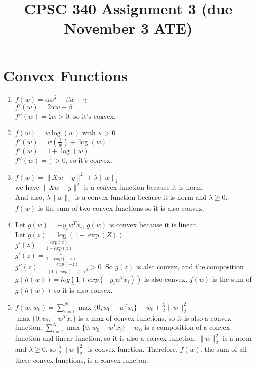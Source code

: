\documentclass{article}
\def\norm#1{\|#1\|}
\def\enum#1{\begin{enumerate}#1\end{enumerate}}
\begin{document}
\title{CPSC 340 Assignment 3 (due November 3 ATE)}
\author{}
\date{}
\maketitle
\vspace{-4em}



\section{Convex Functions}

\enum{
\item $f(w) = \alpha w^2 - \beta w + \gamma$\\
         $f'(w) = 2\alpha w  - \beta $\\
          $f''(w) = 2\alpha   >0  $, so it's convex.
\item $f(w) = w\log(w) $ with $w > 0$\\ 
       $f'(w) = w(\frac{1}{w})+ \log(w) $\\
       $f'(w) = 1+ \log(w) $ \\
       $f''(w) = \frac{1}{w}  >0 $, so it's convex.
\item $f(w) = \norm{Xw-y}^2 + \lambda\norm{w}_1$ \\
        we have $ \norm{Xw-y}^2$ is a convex function because it is norm.\\
       And also, $\lambda\norm{w}_1$  is a convex function because it is norm and $\lambda \geq 0$.\\ $f(w)$ is the sum of two convex functions so it is also convex. 
\item Let $g(w) = -y_iw^Tx_i$, $g(w)$ is convex because it is linear.\\
      Let  $g(z) = \log(1+\exp(Z))$\\
        $g'(z) = \frac{exp(z)}{1+exp(z)}$\\
         $g'(z) = \frac{1}{1+exp(-z)}$\\
        $g''(z) =  \frac{exp(-z)}{(1+exp(-z))^2}   > 0 $. So $g(z)$ is also convex, and the composition $g(h(w)) = log(1+exp(-y_iw^Tx_i))$ is also convex. $f(w)$ is the sum of $g(h(w))$ so it is also convex.
\item $f(w,w_0) = \sum_{i=1}^N\max\{0,w_0 - w^Tx_i\} - w_0 + \frac{\lambda}{2}\norm{w}_2^2$\\
        $\max\{0,w_0 - w^Tx_i\} $ is a max of convex functions, so it is also a convex function. $\sum_{i=1}^N\max\{0,w_0 - w^Tx_i\} - w_0  $ is a composition of a convex function and linear function, so it is also a convex function. $\norm{w}_2^2$ is a norm and $\lambda \geq 0$, so $ \frac{\lambda}{2}\norm{w}_2^2$\ is convex function.
Therefore, $f(w)$, the sum of all these convex functions, is a convex functon.
}
\end{document}
